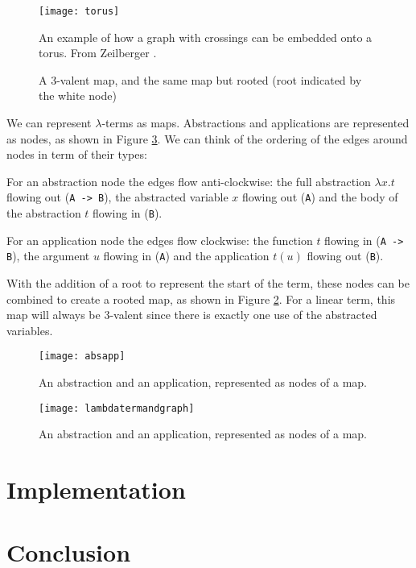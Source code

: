 \documentclass[12pt]{article}
\providecommand{\shortcite}[1]{\cite{#1}}
\begin{document}
\begin{figure}
    \centering
    \texttt{[image: torus]}
    \caption{An example of how a graph with crossings can be embedded onto a torus. From Zeilberger \shortcite{zeil4ct}.}
    \label{fig:torus}
\end{figure}

\begin{figure}
    \centering
    
    \caption{A 3-valent map, and the same map but rooted (root indicated by the white node)}
    \label{fig:trivalentrooted}
\end{figure}

We can represent $\lambda$-terms as maps. Abstractions and applications are represented as nodes, as shown in Figure \ref{fig:absapp}. We can think of the ordering of the edges around nodes in term of their types:

For an abstraction node the edges flow anti-clockwise: the full abstraction $\lambda x. t$ flowing out (\texttt{A -> B}), the abstracted variable $x$ flowing out (\texttt{A}) and the body of the abstraction $t$ flowing in (\texttt{B}). 

For an application node the edges flow clockwise: the function $t$ flowing in (\texttt{A -> B}), the argument $u$ flowing in (\texttt{A}) and the application $t(u)$ flowing out (\texttt{B}).

With the addition of a root to represent the start of the term, these nodes can be combined to create a rooted map, as shown in Figure \ref{fig:trivalentrooted}. For a linear term, this map will always be 3-valent since there is exactly one use of the abstracted variables.

\begin{figure}
    \centering
    \texttt{[image: absapp]}
    \caption{An abstraction and an application, represented as nodes of a map.}
    \label{fig:absapp}
\end{figure}

\begin{figure}
    \centering
    \texttt{[image: lambdatermandgraph]}
    \caption{An abstraction and an application, represented as nodes of a map.}
    \label{fig:lambdatermandgrapht}
\end{figure}

\newpage

\section{Implementation}
\label{sec:implementation}

\newpage

\section{Conclusion}
\label{sec:conclusion}


\end{document}

